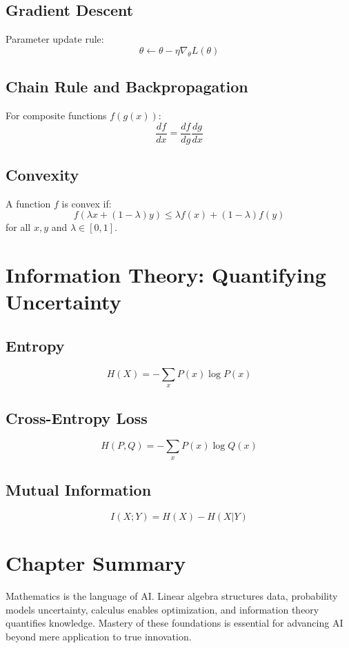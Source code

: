 \documentclass[openany]{book}
\begin{document}
\subsection{Gradient Descent}
Parameter update rule:
\[
\theta \leftarrow \theta - \eta \nabla_\theta L(\theta)
\]

\subsection{Chain Rule and Backpropagation}
For composite functions $f(g(x))$:
\[
\frac{df}{dx} = \frac{df}{dg}\frac{dg}{dx}
\]

\subsection{Convexity}
A function $f$ is convex if:
\[
f(\lambda x + (1-\lambda)y) \leq \lambda f(x) + (1-\lambda)f(y)
\]
for all $x,y$ and $\lambda \in [0,1]$.

\section{Information Theory: Quantifying Uncertainty}

\subsection{Entropy}
\[
H(X) = -\sum_x P(x)\log P(x)
\]

\subsection{Cross-Entropy Loss}
\[
H(P,Q) = -\sum_x P(x)\log Q(x)
\]

\subsection{Mutual Information}
\[
I(X;Y) = H(X) - H(X|Y)
\]

\section{Chapter Summary}

Mathematics is the language of AI. Linear algebra structures data, probability 
models uncertainty, calculus enables optimization, and information theory 
quantifies knowledge. Mastery of these foundations is essential for advancing 
AI beyond mere application to true innovation.
\end{document}
